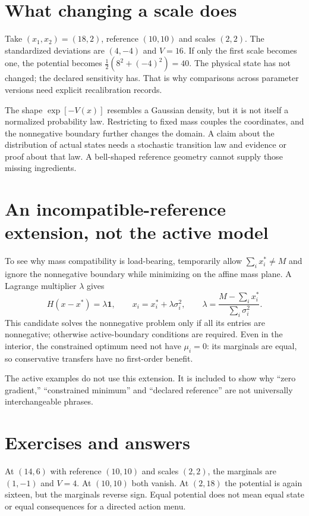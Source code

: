 \section{What changing a scale does}
Take $(x_1,x_2)=(18,2)$, reference $(10,10)$ and scales $(2,2)$.
The standardized deviations are $(4,-4)$ and $V=16$. If only the first
scale becomes one, the potential becomes
$\tfrac12(8^2+(-4)^2)=40$. The physical state has not changed; the
declared sensitivity has. That is why comparisons across parameter versions
need explicit recalibration records.

The shape $\exp[-V(x)]$ resembles a Gaussian density, but it is not itself
a normalized probability law. Restricting to fixed mass couples the
coordinates, and the nonnegative boundary further changes the domain. A
claim about the distribution of actual states needs a stochastic transition
law and evidence or proof about that law. A bell-shaped reference geometry
cannot supply those missing ingredients.

\section{An incompatible-reference extension, not the active model}
To see why mass compatibility is load-bearing, temporarily allow
$\sum_i x_i^*\ne M$ and ignore the nonnegative boundary while minimizing
on the affine mass plane. A Lagrange multiplier $\lambda$ gives
\begin{equation}
 H(x-x^*)=\lambda\mathbf1,
 \qquad x_i=x_i^*+\lambda\sigma_i^2,
 \qquad\lambda=\frac{M-\sum_i x_i^*}{\sum_i\sigma_i^2}.
\end{equation}
This candidate solves the nonnegative problem only if all its entries are
nonnegative; otherwise active-boundary conditions are required. Even in the
interior, the constrained optimum need not have $\mu_i=0$: its marginals
are equal, so conservative transfers have no first-order benefit.

The active examples do not use this extension. It is included to show why
``zero gradient,'' ``constrained minimum'' and ``declared reference'' are
not universally interchangeable phrases.

\section*{Exercises and answers}
At $(14,6)$ with reference $(10,10)$ and scales $(2,2)$, the marginals are
$(1,-1)$ and $V=4$. At $(10,10)$ both vanish. At $(2,18)$ the potential is
again sixteen, but the marginals reverse sign. Equal potential does not mean
equal state or equal consequences for a directed action menu.

